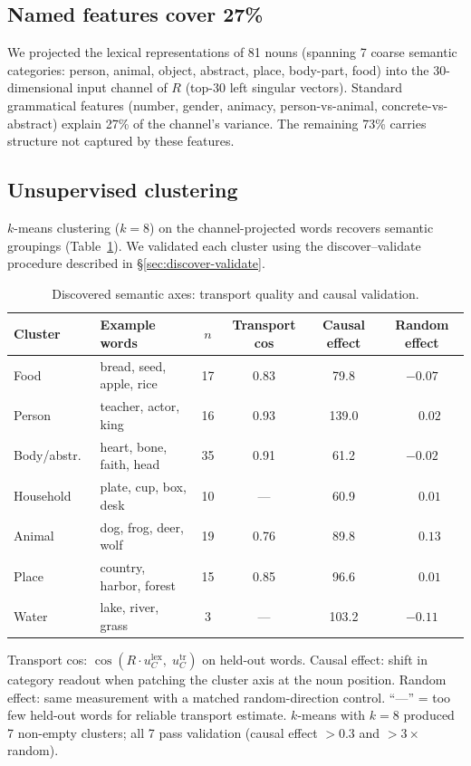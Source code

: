 \documentclass[11pt,a4paper]{article}
\begin{document}
\subsection{Named features cover 27\%}

We projected the lexical representations of 81 nouns (spanning 7 coarse semantic categories:
person, animal, object, abstract, place, body-part, food) into the 30-dimensional input
channel of $R$ (top-30 left singular vectors). Standard grammatical features (number, gender,
animacy, person-vs-animal, concrete-vs-abstract) explain 27\% of the channel's variance. The
remaining 73\% carries structure not captured by these features.

\subsection{Unsupervised clustering}

$k$-means clustering ($k=8$) on the channel-projected words recovers semantic groupings
(Table~\ref{tab:discovered-axes}). We validated each cluster using the discover--validate
procedure described in \S\ref{sec:discover-validate}.

\begin{table}[t]
\centering
\caption{Discovered semantic axes: transport quality and causal validation.}
\label{tab:discovered-axes}
\begin{tabular}{llcccc}
\toprule
Cluster & Example words & $n$ & Transport cos & Causal effect & Random effect \\
\midrule
Food       & bread, seed, apple, rice   & 17 & 0.83 & 79.8  & $-0.07$ \\
Person     & teacher, actor, king       & 16 & 0.93 & 139.0 & $\phantom{-}0.02$ \\
Body/abstr.\ & heart, bone, faith, head & 35 & 0.91 & 61.2  & $-0.02$ \\
Household  & plate, cup, box, desk      & 10 & ---  & 60.9  & $\phantom{-}0.01$ \\
Animal     & dog, frog, deer, wolf      & 19 & 0.76 & 89.8  & $\phantom{-}0.13$ \\
Place      & country, harbor, forest    & 15 & 0.85 & 96.6  & $\phantom{-}0.01$ \\
Water      & lake, river, grass         &  3 & ---  & 103.2 & $-0.11$ \\
\bottomrule
\end{tabular}

\smallskip\small
Transport cos: $\cos(R \cdot u_C^\mathrm{lex},\; u_C^\mathrm{tr})$ on held-out words.
Causal effect: shift in category readout when patching the cluster axis at the noun position.
Random effect: same measurement with a matched random-direction control. ``---'' = too few
held-out words for reliable transport estimate. $k$-means with $k=8$ produced 7 non-empty
clusters; all 7 pass validation (causal effect $> 0.3$ and $> 3\times$ random).
\end{table}
\end{document}
